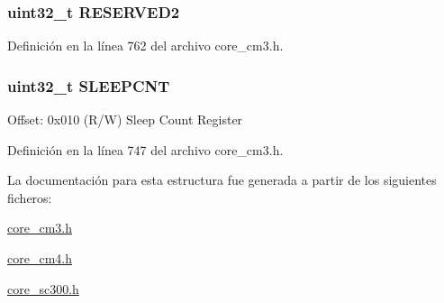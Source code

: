 \subsubsection[{\texorpdfstring{R\+E\+S\+E\+R\+V\+E\+D2}{RESERVED2}}]{\setlength{\rightskip}{0pt plus 5cm}uint32\+\_\+t R\+E\+S\+E\+R\+V\+E\+D2}\hypertarget{struct_d_w_t___type_aa4de71b2a578cce3a67229dde3c6b52d}{}\label{struct_d_w_t___type_aa4de71b2a578cce3a67229dde3c6b52d}


Definición en la línea 762 del archivo core\+\_\+cm3.\+h.

\subsubsection[{\texorpdfstring{S\+L\+E\+E\+P\+C\+NT}{SLEEPCNT}}]{ uint32\+\_\+t S\+L\+E\+E\+P\+C\+NT}\hypertarget{struct_d_w_t___type_a720f3795a53a8d8f275df636fee1aee7}{}\label{struct_d_w_t___type_a720f3795a53a8d8f275df636fee1aee7}
Offset\+: 0x010 (R/W) Sleep Count Register 

Definición en la línea 747 del archivo core\+\_\+cm3.\+h.



La documentación para esta estructura fue generada a partir de los siguientes ficheros\+:\begin{DoxyCompactItemize}
\item 
\hyperlink{core__cm3_8h}{core\+\_\+cm3.\+h}\item 
\hyperlink{core__cm4_8h}{core\+\_\+cm4.\+h}\item 
\hyperlink{core__sc300_8h}{core\+\_\+sc300.\+h}\end{DoxyCompactItemize}
